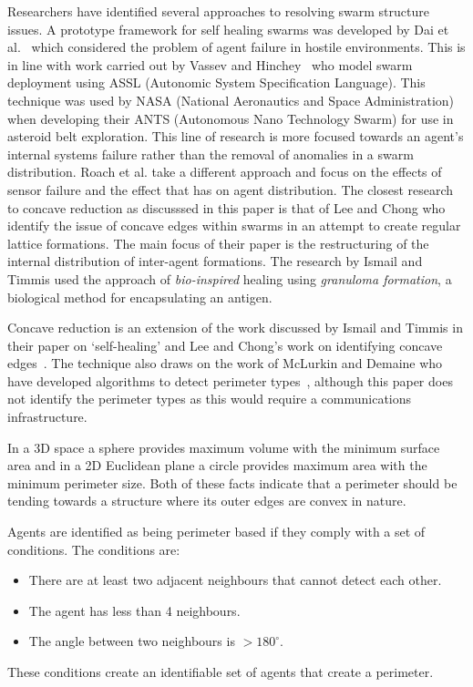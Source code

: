 \documentclass{ieeeaccess}
\begin{document}
Researchers have identified several approaches to resolving swarm structure issues. A prototype framework for self healing swarms was developed by Dai et al.~\cite{DHMRZ:06} which considered the problem of agent failure in hostile environments. This is in line with work carried out by Vassev and Hinchey~\cite{VH:09} who model swarm deployment using ASSL (Autonomic System Specification Language). This technique was used by NASA (National Aeronautics and Space Administration) when developing their ANTS (Autonomous Nano Technology Swarm) for use in asteroid belt exploration. This line of research is more focused towards an agent's internal systems failure rather than the removal of anomalies in a swarm distribution. Roach et al. \cite{RMT:15} take a different approach and focus on the effects of sensor failure and the effect that has on agent distribution. The closest research to concave reduction as discusssed in this paper is that of Lee and Chong \cite{GN:08} who identify the issue of concave edges within swarms in an attempt to create regular lattice formations. The main focus of their paper is the restructuring of the internal distribution of inter-agent formations. The research by Ismail and Timmis \cite{IT:10} used the approach of \textit{bio-inspired} healing using \textit{granuloma formation}, a biological method for encapsulating an antigen.

Concave reduction is an extension of the work discussed by Ismail and Timmis in their paper on `self-healing' \cite{IT:10} and Lee and Chong's work on identifying concave edges~\cite{GN:08}. The technique also draws on the work of McLurkin and Demaine who have developed algorithms to detect perimeter types~\cite{MD:09}, although this paper does not identify the perimeter types as this would require a communications infrastructure.
 
In a 3D space a sphere provides maximum volume with the minimum surface area and in a 2D Euclidean plane a circle provides maximum area with the minimum perimeter size. Both of these facts indicate that a perimeter should be tending towards a structure where its outer edges are convex in nature. 

Agents are identified as being perimeter based if they comply with a set of conditions. The conditions are: 
\begin{itemize}
  \item There are at least two adjacent neighbours that cannot detect each other.
  \item The agent has less than 4 neighbours.
  \item The angle between two neighbours is $> 180^\circ$.
\end{itemize} 
These conditions create an identifiable set of agents that create a perimeter.
\end{document}
